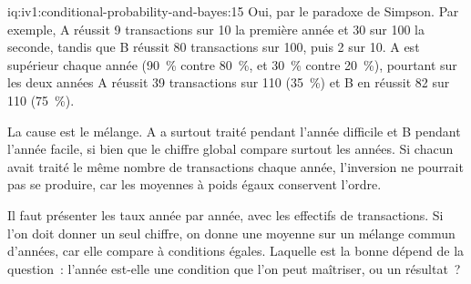 \begin{solution}{iq:iv1:conditional-probability-and-bayes:15}
Oui, par le paradoxe de Simpson. Par exemple, A réussit 9 transactions sur 10 la première année et 30 sur 100 la seconde, tandis que B réussit 80 transactions sur 100, puis 2 sur 10. A est supérieur chaque année (90~\% contre 80~\%, et 30~\% contre 20~\%), pourtant sur les deux années A réussit 39 transactions sur 110 (35~\%) et B en réussit 82 sur 110 (75~\%).

La cause est le mélange. A a surtout traité pendant l'année difficile et B pendant l'année facile, si bien que le chiffre global compare surtout les années. Si chacun avait traité le même nombre de transactions chaque année, l'inversion ne pourrait pas se produire, car les moyennes à poids égaux conservent l'ordre.

Il faut présenter les taux année par année, avec les effectifs de transactions. Si l'on doit donner un seul chiffre, on donne une moyenne sur un mélange commun d'années, car elle compare à conditions égales. Laquelle est la bonne dépend de la question~: l'année est-elle une condition que l'on peut maîtriser, ou un résultat~?

\end{solution}

